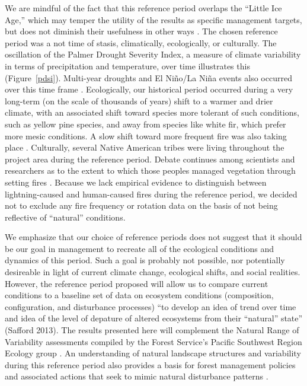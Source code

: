 We are mindful of the fact that this reference period overlaps the ``Little Ice Age,'' which may temper the utility of the results as specific management targets, but does not diminish their usefulness in other ways \citep{Safford2013}. The chosen reference period was a not time of stasis, climatically, ecologically, or culturally. The oscillation of the Palmer Drought Severity Index, a measure of climate variability in terms of precipitation and temperature, over time illustrates this (Figure~\ref{pdsi}). Multi-year droughts and El Ni\~no/La Ni\~na events also occurred over this time frame \citep{Meyer2013}. Ecologically, our historical period occurred during a very long-term (on the scale of thousands of years) shift to a warmer and drier climate, with an associated shift toward species more tolerant of such conditions, such as yellow pine species, and away from species like white fir, which prefer more mesic conditions. A slow shift toward more frequent fire was also taking place \citep{Safford2013}. Culturally, several Native American tribes were living throughout the project area during the reference period. Debate continues among scientists and researchers as to the extent to which those peoples managed vegetation through setting fires \citep{Safford2013}. Because we lack empirical evidence to distinguish between lightning-caused and human-caused fires during the reference period, we decided not to exclude any fire frequency or rotation data on the basis of not being reflective of ``natural'' conditions. 

We emphasize that our choice of reference periods does not suggest that it should be our goal in management to recreate all of the ecological conditions and dynamics of this period. Such a goal is probably not possible, nor potentially desireable in light of current climate change, ecological shifts, and social realities. However, the reference period proposed will allow us to compare current conditions to a baseline set of data on ecosystem conditions (composition, configuration, and disturbance processes) ``to develop an idea of trend over time and idea of the level of depature of altered ecosystems from their ``natural'' state'' (Safford 2013). The results presented here will complement the Natural Range of Variability assessments compiled by the Forest Service's Pacific Southwest Region Ecology group \citep[e.g.,][]{Safford2013,Merriam2013,Meyer2013a,Meyer2013,Estes2013,Estes2013a,Gross2013}. An understanding of natural landscape structures and variability during this reference period also provides a basis for forest management policies and associated actions that seek to mimic natural disturbance patterns \cite{Romme2000,Buse2002}. 



